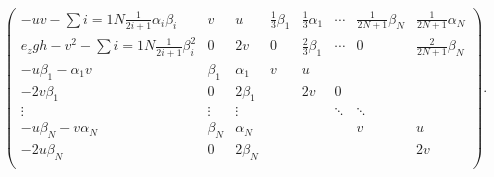 \begin{gather}
\begin{pmatrix}
      -uv - \sum{i = 1}{N}{\frac{1}{2i + 1} \alpha_i \beta_i}        & v       & u         & \frac{1}{3} \beta_{1} & \frac{1}{3} \alpha_{1} & \cdots & \frac{1}{2N+1} \beta_N & \frac{1}{2N+1} \alpha_N  \\
      e_{z} g h - v^{2} - \sum{i = 1}{N}{\frac{1}{2i + 1} \beta_i^2} & 0       & 2v        & 0                     & \frac{2}{3} \beta_1    & \cdots & 0                      & \frac{2}{2N + 1} \beta_N \\
      - u\beta_1 - \alpha_1 v                                        & \beta_1 & \alpha_1  & v                     & u                      &        &                        &                          \\
      -2 v \beta_1                                                   & 0       & 2 \beta_1 &                       & 2 v                    & 0      &                        &                          \\
      \vdots                                                         & \vdots  & \vdots    &                       &                        & \ddots & \ddots                 &                          \\
      -u \beta_N - v \alpha_N                                        & \beta_N & \alpha_N  &                       &                        &        & v                      & u                        \\
      -2 u \beta_N                                                   & 0       & 2 \beta_N &                       &                        &        &                        & 2v                       \\
    \end{pmatrix}.
  \end{gather}

